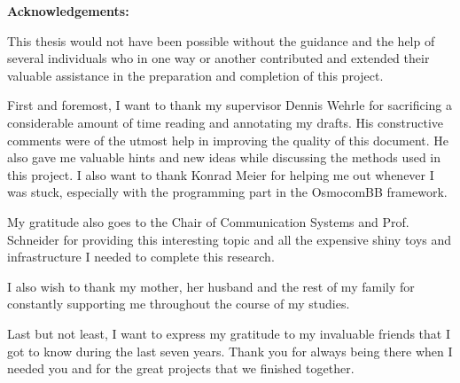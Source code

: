 \begin{center}
\textbf{Acknowledgements:}
\end{center}
This thesis would not have been possible without the guidance and the help of several individuals who in one way or another contributed and extended their valuable assistance in the preparation and completion of this project.

First and foremost, I want to thank my supervisor Dennis Wehrle for sacrificing a considerable amount of time reading and annotating my drafts. His constructive comments were of the utmost help in improving the quality of this document.
He also gave me valuable hints and new ideas while discussing the methods used in this project.
I also want to thank Konrad Meier for helping me out whenever I was stuck, especially with the programming part in the OsmocomBB framework.

My gratitude also goes to the Chair of Communication Systems and Prof. Schneider for providing this interesting topic and all the expensive shiny toys and infrastructure I needed to complete this research.

I also wish to thank my mother, her husband and the rest of my family for constantly supporting me throughout the course of my studies.

Last but not least, I want to express my gratitude to my invaluable friends that I got to know during the last seven years.
Thank you for always being there when I needed you and for the great projects that we finished together.



